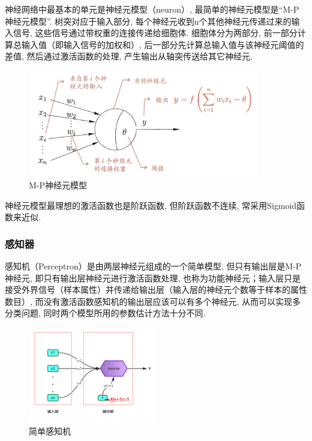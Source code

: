 \documentclass[a4paper]{article}
\begin{document}
神经网络中最基本的单元是神经元模型（neuron）, 最简单的神经元模型是“M-P神经元模型”.
树突对应于输入部分, 每个神经元收到n个其他神经元传递过来的输入信号, 这些信号通过带权重的连接传递给细胞体.
细胞体分为两部分, 前一部分计算总输入值（即输入信号的加权和）, 后一部分先计算总输入值与该神经元阈值的差值, 然后通过激活函数的处理, 产生输出从轴突传送给其它神经元.
\begin{figure}
    \centering
    \label{MP_Model}
    \includegraphics[width=0.9\textwidth]{MP_Modle.png}
    \caption{M-P神经元模型}
\end{figure}

神经元模型最理想的激活函数也是阶跃函数, 但阶跃函数不连续, 常采用Sigmoid函数来近似.

\subsubsection{感知器}
感知机（Perceptron）是由两层神经元组成的一个简单模型, 但只有输出层是M-P神经元, 即只有输出层神经元进行激活函数处理, 也称为功能神经元；输入层只是接受外界信号（样本属性）并传递给输出层（输入层的神经元个数等于样本的属性数目）, 而没有激活函数感知机的输出层应该可以有多个神经元, 从而可以实现多分类问题, 同时两个模型所用的参数估计方法十分不同.

\begin{figure}
    \centering
    \label{MP}
    \includegraphics[width=0.5\textwidth]{simple_perceptron.png}
    \caption{简单感知机}
\end{figure}
\newpage
\end{document}
